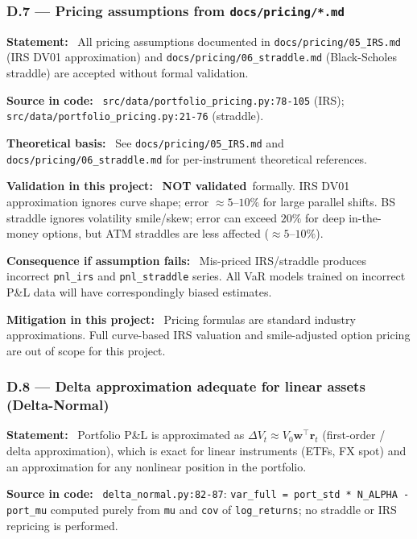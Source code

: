 \documentclass[11pt,a4paper]{article}
\newcommand{\asmfield}[1]{\medskip\noindent\textbf{#1:}\ }
\newcommand{\code}[1]{\texttt{#1}}
\newcommand{\notvalidated}{\textbf{NOT validated}}
\begin{document}
\subsubsection{D.7 --- Pricing assumptions from \texttt{docs/pricing/*.md}}\label{asm:D7}

\asmfield{Statement}
All pricing assumptions documented in \code{docs/pricing/05\_IRS.md} (IRS
DV01 approximation) and \code{docs/pricing/06\_straddle.md} (Black-Scholes
straddle) are accepted without formal validation.

\asmfield{Source in code}
\code{src/data/portfolio\_pricing.py:78-105} (IRS);
\code{src/data/portfolio\_pricing.py:21-76} (straddle).

\asmfield{Theoretical basis}
See \code{docs/pricing/05\_IRS.md} and \code{docs/pricing/06\_straddle.md}
for per-instrument theoretical references.

\asmfield{Validation in this project}
\notvalidated\ formally. IRS DV01 approximation ignores curve shape;
error $\approx 5$--$10\%$ for large parallel shifts. BS straddle ignores
volatility smile/skew; error can exceed $20\%$ for deep in-the-money options,
but ATM straddles are less affected ($\approx 5$--$10\%$).

\asmfield{Consequence if assumption fails}
Mis-priced IRS/straddle produces incorrect \code{pnl\_irs} and
\code{pnl\_straddle} series. All VaR models trained on incorrect P\&L data
will have correspondingly biased estimates.

\asmfield{Mitigation in this project}
Pricing formulas are standard industry approximations. Full curve-based IRS
valuation and smile-adjusted option pricing are out of scope for this project.

\subsubsection{D.8 --- Delta approximation adequate for linear assets (Delta-Normal)}\label{asm:D8}

\asmfield{Statement}
Portfolio P\&L is approximated as $\Delta V_t \approx V_0
\mathbf{w}^\top \mathbf{r}_t$ (first-order / delta approximation), which
is exact for linear instruments (ETFs, FX spot) and an approximation for
any nonlinear position in the portfolio.

\asmfield{Source in code}
\code{delta\_normal.py:82-87}: \lstinline|var_full = port_std * N_ALPHA - port_mu|
computed purely from \code{mu} and \code{cov} of \code{log\_returns};
no straddle or IRS repricing is performed.
\end{document}

